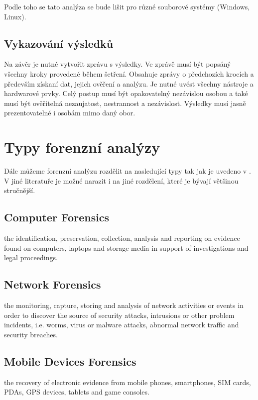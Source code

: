 \documentclass[thesis=B,czech]{FITthesis}[2012/06/26]
\begin{document}
\cite{for_root} Podle toho se tato analýza se bude lišit pro různé souborové systémy (Windows, Linux).

\subsection{Vykazování výsledků}
Na závěr je nutné vytvořit zprávu s výsledky. Ve zprávě musí být popsáný všechny kroky provedené během šetření. Obsahuje zprávy o předchozích krocích a především získaní dat, jejich ověření a analýzu. Je nutné uvést všechny nástroje a hardwarové prvky. Celý postup musí být opakovatelný nezávislou osobou a také musí být ověřitelná nezaujatost, nestrannost a nezávislost. Výsledky musí jasně prezentovatelné i osobám mimo daný obor.

\section{Typy forenzní analýzy}
Dále můžeme forenzní analýzu rozdělit na nasledující typy tak jak je uvedeno v \cite{for_types}. V jiné literatuře je možné narazit i na jiné rozdělení, které je bývají většinou stručnější.

\subsection{Computer Forensics}
the identification, preservation, collection, analysis and reporting on evidence found on computers, laptops and storage media in support of investigations and legal proceedings.
\subsection{Network Forensics}
the monitoring, capture, storing and analysis of network activities or events in order to discover the source of security attacks, intrusions or other problem incidents, i.e. worms, virus or malware attacks, abnormal network traffic and security breaches.
\subsection{Mobile Devices Forensics}
the recovery of electronic evidence from mobile phones, smartphones, SIM cards, PDAs, GPS devices, tablets and game consoles.
\end{document}
